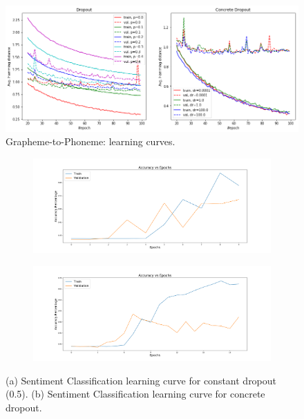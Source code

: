 \documentclass{article}
\begin{document}
\begin{figure}[!h]
\centering
\centering
\includegraphics[width=\linewidth]{nlp_curves.png}
\caption{Grapheme-to-Phoneme: learning curves.}
\label{fig:nlpcurves}
\end{figure}

\begin{figure}[!h]
\centering
\begin{subfigure}{.7\textwidth}
  \centering
  \includegraphics[width=\linewidth]{NLP2_Accuracy_2.png}
  \caption{}
\end{subfigure}%

\begin{subfigure}{.7\textwidth}
  \centering
  \includegraphics[width=\linewidth]{NLP2_Accuracy_3.png}
  \caption{}
\end{subfigure}%
\caption{(a) Sentiment Classification learning curve for constant dropout (0.5). (b) Sentiment Classification learning curve for concrete dropout.}
\label{fig:sentiment}
\end{figure}
\end{document}
